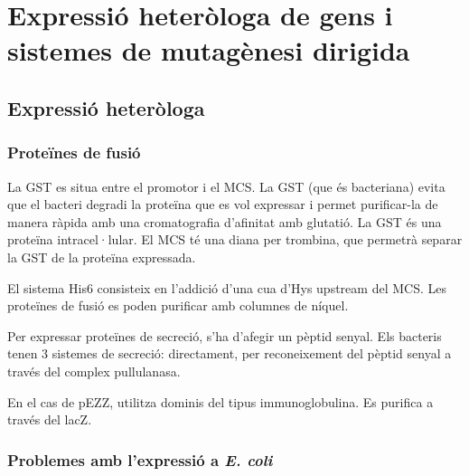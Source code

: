 \section{Expressió heteròloga de gens i sistemes de mutagènesi dirigida}
\label{sec:expr-heter-de}

\subsection{Expressió heteròloga}
\label{sec:expressio-heterologa}

\subsubsection{Proteïnes de fusió}
\label{sec:proteines-de-fusio}

La GST es situa entre el promotor i el MCS. La GST (que és bacteriana)
evita que el bacteri degradi la proteïna que es vol expressar i permet
purificar-la de manera ràpida amb una cromatografia d'afinitat amb
glutatió. La GST és una proteïna intracel·lular. El MCS té una diana
per trombina, que permetrà separar la GST de la proteïna expressada.

El sistema His6 consisteix en l'addició d'una cua d'Hys upstream del
MCS. Les proteïnes de fusió es poden purificar amb columnes de níquel.

Per expressar proteïnes de secreció, s'ha d'afegir un pèptid
senyal. Els bacteris tenen 3 sistemes de secreció: directament, per
reconeixement del pèptid senyal a través del complex pullulanasa.

En el cas de pEZZ, utilitza dominis del tipus immunoglobulina. Es
purifica a través del lacZ.

\subsubsection{Problemes amb l'expressió a \textit{E. coli}}
\label{sec:probl-amb-lexpr}

